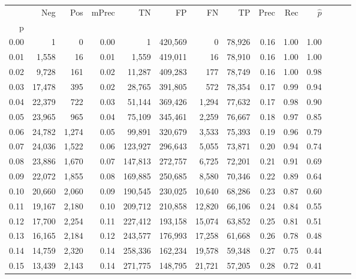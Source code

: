 \begin{tabular}{rrrrrrrrrrrrrr}
\toprule
{} &     Neg &    Pos & mPrec &       TN &       FP &      FN &      TP &  Prec &   Rec & $\hat{p}$ \\
p    &         &        &       &          &          &         &         &       &       &           \\
\midrule
0.00 &       1 &      0 &  0.00 &        1 &  420,569 &       0 &  78,926 &  0.16 &  1.00 &      1.00 \\
0.01 &   1,558 &     16 &  0.01 &    1,559 &  419,011 &      16 &  78,910 &  0.16 &  1.00 &      1.00 \\
0.02 &   9,728 &    161 &  0.02 &   11,287 &  409,283 &     177 &  78,749 &  0.16 &  1.00 &      0.98 \\
0.03 &  17,478 &    395 &  0.02 &   28,765 &  391,805 &     572 &  78,354 &  0.17 &  0.99 &      0.94 \\
0.04 &  22,379 &    722 &  0.03 &   51,144 &  369,426 &   1,294 &  77,632 &  0.17 &  0.98 &      0.90 \\
0.05 &  23,965 &    965 &  0.04 &   75,109 &  345,461 &   2,259 &  76,667 &  0.18 &  0.97 &      0.85 \\
0.06 &  24,782 &  1,274 &  0.05 &   99,891 &  320,679 &   3,533 &  75,393 &  0.19 &  0.96 &      0.79 \\
0.07 &  24,036 &  1,522 &  0.06 &  123,927 &  296,643 &   5,055 &  73,871 &  0.20 &  0.94 &      0.74 \\
0.08 &  23,886 &  1,670 &  0.07 &  147,813 &  272,757 &   6,725 &  72,201 &  0.21 &  0.91 &      0.69 \\
0.09 &  22,072 &  1,855 &  0.08 &  169,885 &  250,685 &   8,580 &  70,346 &  0.22 &  0.89 &      0.64 \\
0.10 &  20,660 &  2,060 &  0.09 &  190,545 &  230,025 &  10,640 &  68,286 &  0.23 &  0.87 &      0.60 \\
0.11 &  19,167 &  2,180 &  0.10 &  209,712 &  210,858 &  12,820 &  66,106 &  0.24 &  0.84 &      0.55 \\
0.12 &  17,700 &  2,254 &  0.11 &  227,412 &  193,158 &  15,074 &  63,852 &  0.25 &  0.81 &      0.51 \\
0.13 &  16,165 &  2,184 &  0.12 &  243,577 &  176,993 &  17,258 &  61,668 &  0.26 &  0.78 &      0.48 \\
0.14 &  14,759 &  2,320 &  0.14 &  258,336 &  162,234 &  19,578 &  59,348 &  0.27 &  0.75 &      0.44 \\
0.15 &  13,439 &  2,143 &  0.14 &  271,775 &  148,795 &  21,721 &  57,205 &  0.28 &  0.72 &      0.41 \\

\end{tabular}
